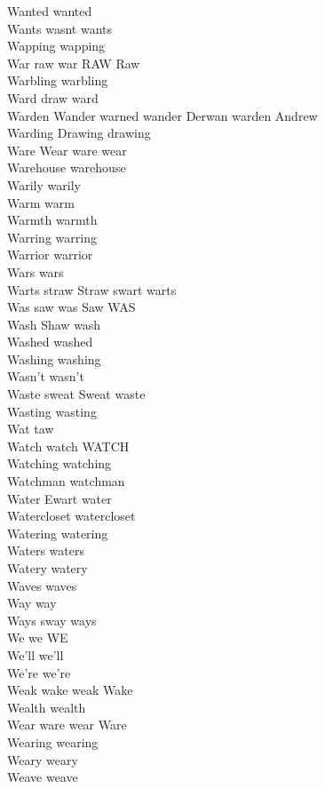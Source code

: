 Wanted wanted\\
Wants wasnt wants\\
Wapping wapping\\
War raw war RAW Raw\\
Warbling warbling\\
Ward draw ward\\
Warden Wander warned wander Derwan warden Andrew\\
Warding Drawing drawing\\
Ware Wear ware wear\\
Warehouse warehouse\\
Warily warily\\
Warm warm\\
Warmth warmth\\
Warring warring\\
Warrior warrior\\
Wars wars\\
Warts straw Straw swart warts\\
Was saw was Saw WAS\\
Wash Shaw wash\\
Washed washed\\
Washing washing\\
Wasn't wasn't\\
Waste sweat Sweat waste\\
Wasting wasting\\
Wat taw\\
Watch watch WATCH\\
Watching watching\\
Watchman watchman\\
Water Ewart water\\
Watercloset watercloset\\
Watering watering\\
Waters waters\\
Watery watery\\
Waves waves\\
Way way\\
Ways sway ways\\
We we WE\\
We'll we'll\\
We're we're\\
Weak wake weak Wake\\
Wealth wealth\\
Wear ware wear Ware\\
Wearing wearing\\
Weary weary\\
Weave weave\\
